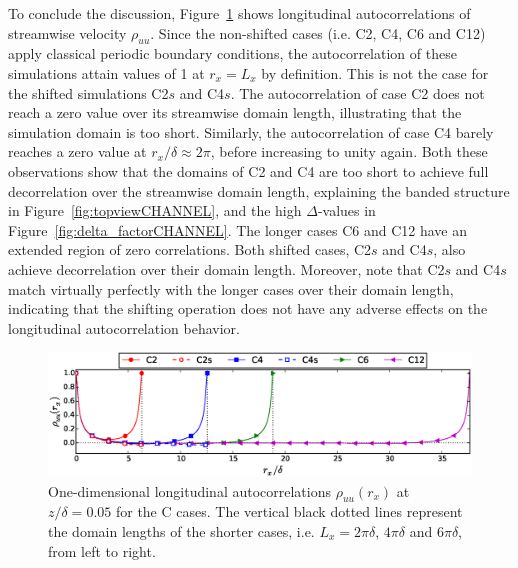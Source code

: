 		To conclude the discussion, Figure~\ref{fig:correlationsC} shows longitudinal autocorrelations of streamwise velocity $\rho_{uu}$.
		Since the non-shifted cases (i.e. C2, C4, C6 and C12) apply classical periodic boundary conditions, the autocorrelation of these
		simulations attain values of 1 at $r_x = L_x$ by definition. This is not the case for the shifted simulations C2$s$ and C4$s$. The
		autocorrelation of case C2 does not reach a zero value over its streamwise domain length, illustrating that the simulation domain is
		too short. Similarly, the autocorrelation of case C4 barely reaches a zero value at $r_x/\delta \approx 2 \pi$, before increasing to unity again. Both these observations show that the domains of C2 and C4 are too short to achieve full decorrelation over the streamwise domain length, explaining the banded structure in Figure~\ref{fig:topviewCHANNEL}, and the high $\Delta$-values in Figure~\ref{fig:delta_factorCHANNEL}. The longer cases C6 and C12 have an extended region of zero correlations. Both shifted cases, C2$s$ and C4$s$, also achieve decorrelation over their domain length. Moreover, note that C2$s$ and C4$s$ match virtually perfectly with the longer cases over their domain length, indicating that the shifting operation does not have any adverse effects on the longitudinal autocorrelation behavior.
		
		\begin{figure}
				\centering
			\includegraphics[width=\textwidth,trim= 0cm 0.2cm 0cm 0.cm,clip]{chapters/turbulent_inflow/spbc/figure6}
			\caption[One-dimensional longitudinal autocorrelations $\rho_{uu}(r_x)$ at $z/\delta = 0.05$ for the C cases.]{One-dimensional longitudinal autocorrelations $\rho_{uu}(r_x)$ at $z/\delta = 0.05$ for the C cases. The vertical black dotted lines represent the domain lengths of the shorter cases, i.e. $L_x = 2\pi\delta$, $4\pi\delta$ and $6\pi\delta$, from left to right.}
			\label{fig:correlationsC}
		\end{figure}
		
		
